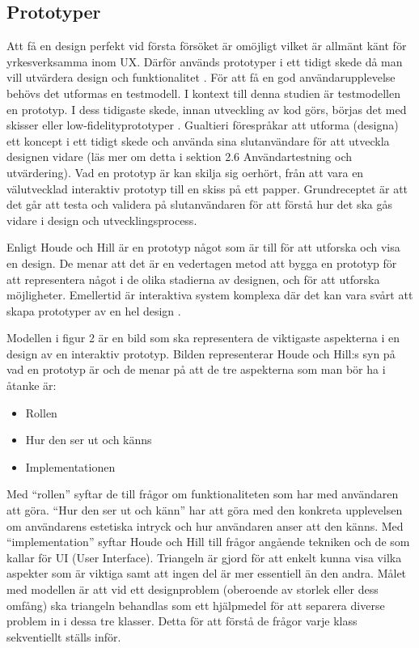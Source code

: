 \subsection{Prototyper}
Att få en design perfekt vid första försöket är omöjligt vilket är allmänt känt för yrkesverksamma inom UX. Därför används prototyper i ett tidigt skede då man vill utvärdera design och funktionalitet \cite{Yamakami2014ExploratoryDesign}. För att få en god användarupplevelse behövs det utformas en testmodell. I kontext till denna studien är testmodellen en prototyp. I dess tidigaste skede, innan utveckling av kod görs, börjas det med skisser eller low-fidelityprototyper \cite{Gualtieri2009BestDesign}. Gualtieri\cite{Gualtieri2009BestDesign} förespråkar att utforma (designa) ett koncept i ett tidigt skede och använda sina slutanvändare för att utveckla designen vidare (läs mer om detta i sektion 2.6 Användartestning och utvärdering). Vad en prototyp är kan skilja sig oerhört, från att vara en välutvecklad interaktiv prototyp till en skiss på ett papper\cite{HoudeWhatPrototype}. Grundreceptet är att det går att testa och validera på slutanvändaren för att förstå hur det ska gås vidare i design och utvecklingsprocess\cite{HoudeWhatPrototype}.
\newline

Enligt Houde och Hill \cite{HoudeWhatPrototype} är en prototyp något som är till för att utforska och visa en design. De menar att det är en vedertagen metod att bygga en prototyp för att representera något i de olika stadierna av designen, och för att utforska möjligheter. Emellertid är interaktiva system komplexa där det kan vara svårt att skapa prototyper av en hel design \cite{HoudeWhatPrototype}.
\newline

Modellen i figur 2 är en bild som ska representera de viktigaste aspekterna i en design av en interaktiv prototyp. Bilden representerar Houde och Hill:s syn på vad en prototyp är och de menar på att de tre aspekterna som man bör ha i åtanke är\cite{HoudeWhatPrototype}:
\begin{itemize}
\item Rollen
\item Hur den ser ut och känns
\item Implementationen
\end{itemize}
Med \enquote{rollen} syftar de till frågor om funktionaliteten som har med användaren att göra. 
\enquote{Hur den ser ut och känn} har att göra med den konkreta upplevelsen om användarens estetiska intryck och hur användaren anser att den känns. Med \enquote{implementation} syftar Houde och Hill till frågor angående tekniken och de som kallar för UI (User Interface). Triangeln är gjord för att enkelt kunna visa vilka aspekter som är viktiga samt att ingen del är mer essentiell än den andra. Målet med modellen är att vid ett designproblem (oberoende av storlek eller dess omfång) ska triangeln behandlas som ett hjälpmedel för att separera diverse problem in i dessa tre klasser. Detta för att förstå de frågor varje klass sekventiellt ställs inför.

